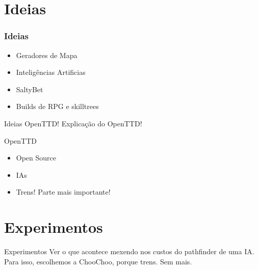 \documentclass[10pt]{beamer}
\begin{document}
%		

\section{Ideias}

\begin{frame}[fragile]
  \frametitle{Ideias}
	  \begin{itemize}
	  	\item Geradores de Mapa
	  	\item Inteligências Artificias
	  	\item SaltyBet
	  	\item Builds de RPG e skilltrees
	  \end{itemize}
\end{frame}

\begin{frame}{Ideias}
	OpenTTD!
	\pause
	Explicação do OpenTTD!
\end{frame}

\begin{frame}{OpenTTD}	
	\begin{itemize}	[<+- | alert@+>]
		\item Open Source
		\item IAs
		\item Trens! Parte mais importante!
	\end{itemize}
\end{frame}

\section{Experimentos}
\begin{frame}{Experimentos}
	Ver o que acontece mexendo nos custos do pathfinder de uma IA.\pause\\
	Para isso, escolhemos a ChooChoo, porque trens. Sem mais.
\end{frame}
\end{document}
